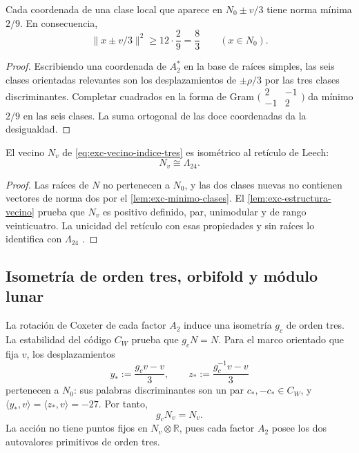 \begin{lemma}
\label{lem:exc-minimo-clases}
Cada coordenada de una clase local que aparece en
\(N_0\pm v/3\) tiene norma mínima \(2/9\). En consecuencia,
\[
 \|x\pm v/3\|^2\ge12\cdot\frac29=\frac83
 \qquad(x\in N_0).
\]
\end{lemma}

\begin{proof}
Escribiendo una coordenada de \(A_2^*\) en la base de raíces simples, las
seis clases orientadas relevantes son los desplazamientos de
\(\pm\rho/3\) por las tres clases discriminantes. Completar cuadrados en la
forma de Gram
\(\bigl(\begin{smallmatrix}2&-1\\-1&2\end{smallmatrix}\bigr)\)
da mínimo \(2/9\) en las seis clases. La suma ortogonal de las doce
coordenadas da la desigualdad.
\end{proof}

\begin{theorem}
\label{thm:exc-leech}
El vecino \(N_v\) de \eqref{eq:exc-vecino-indice-tres} es isométrico al
retículo de Leech:
\begin{equation}
 \boxed{N_v\cong\Lambda_{24}.}
 \label{eq:exc-leech}
\end{equation}
\end{theorem}

\begin{proof}
Las raíces de \(N\) no pertenecen a \(N_0\), y las dos clases nuevas no
contienen vectores de norma dos por el
\cref{lem:exc-minimo-clases}. El \cref{lem:exc-estructura-vecino} prueba que
\(N_v\) es positivo definido, par, unimodular y de rango veinticuatro. La
unicidad del retículo con esas propiedades y sin raíces lo identifica con
\(\Lambda_{24}\) \citep{ConwaySloane1999}.
\end{proof}

\subsection{Isometría de orden tres, orbifold y módulo lunar}

La rotación de Coxeter de cada factor \(A_2\) induce una isometría
\(g_c\) de orden tres. La estabilidad del código \(C_W\) prueba que
\(g_cN=N\). Para el marco orientado que fija \(v\), los desplazamientos
\begin{equation}
 y_*:=\frac{g_cv-v}{3},
 \qquad
 z_*:=\frac{g_c^{-1}v-v}{3}
 \label{eq:exc-desplazamientos-vecino}
\end{equation}
pertenecen a \(N_0\): sus palabras discriminantes son un par
\(c_*,-c_*\in C_W\), y
\(\langle y_*,v\rangle=\langle z_*,v\rangle=-27\). Por tanto,
\begin{equation}
 g_cN_v=N_v.
 \label{eq:exc-preservacion-vecino}
\end{equation}
La acción no tiene puntos fijos en \(N_v\otimes\mathbb R\), pues cada
factor \(A_2\) posee los dos autovalores primitivos de orden tres.

